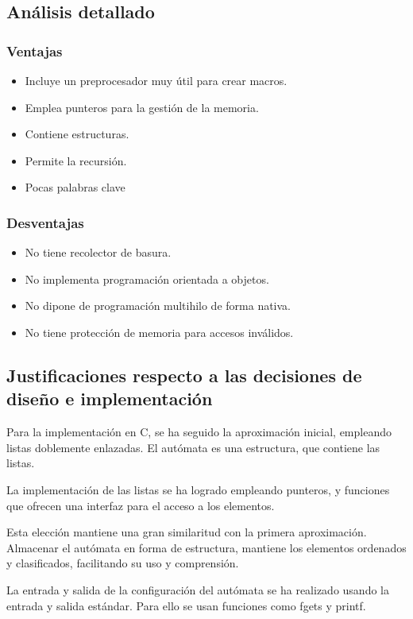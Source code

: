 \documentclass[12pt,a4paper]{article}
\begin{document}
\subsection{Análisis detallado}

\subsubsection{Ventajas}
\begin{itemize}
\item Incluye un preprocesador muy útil para crear macros.
\item Emplea punteros para la gestión de la memoria.
\item Contiene estructuras.
\item Permite la recursión.
\item Pocas palabras clave
\end{itemize}

\subsubsection{Desventajas}
\begin{itemize}
\item No tiene recolector de basura.
\item No implementa programación orientada a objetos.
\item No dipone de programación multihilo de forma nativa.
\item No tiene protección de memoria para accesos inválidos.
\end{itemize}


\subsection{Justificaciones respecto a las decisiones de diseño e 
implementación}
Para la implementación en C, se ha seguido la aproximación inicial, empleando
listas doblemente enlazadas. El autómata es una estructura, que contiene las
listas.

La implementación de las listas se ha logrado empleando punteros, y funciones
que ofrecen una interfaz para el acceso a los elementos.

Esta elección mantiene una gran similaritud con la primera aproximación.
Almacenar el autómata en forma de estructura, mantiene los elementos ordenados y
clasificados, facilitando su uso y comprensión.

La entrada y salida de la configuración del autómata se ha realizado usando la
entrada y salida estándar. Para ello se usan funciones como fgets y printf.
\end{document}
